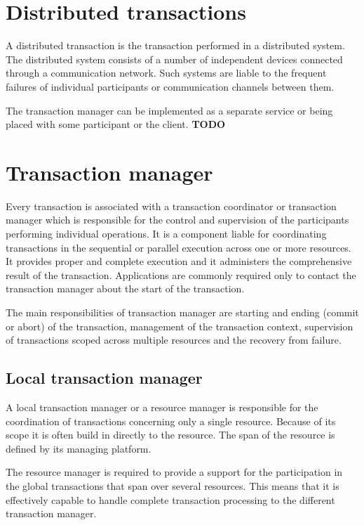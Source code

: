 \documentclass[oneside,
  digital, %
  table,   %
  nolof,     %
  nolot,     %
]{fithesis3}
\begin{document}
\section{Distributed transactions}

A distributed transaction is the transaction performed in a distributed system.  
The distributed system consists of a number of independent devices connected through a communication network. Such systems are liable to the frequent failures of individual participants or communication channels between them. 

The transaction manager can be implemented as a separate service or being placed with some participant or the client. \textbf{TODO}

\section{Transaction manager}

Every transaction is associated with a transaction coordinator or transaction manager which is responsible for the control and supervision of the participants performing individual operations. It is a component liable for coordinating transactions in the sequential or parallel execution across one or more resources. It provides proper and complete execution and it administers the comprehensive result of the transaction.  Applications are commonly required only to contact the transaction manager about the start of the transaction.

The main responsibilities of transaction manager are starting and ending (commit or abort) of the transaction, management of the transaction context, supervision of transactions scoped across multiple resources and the recovery from failure.

\subsection{Local transaction manager}

A local transaction manager or a resource manager is responsible for the coordination of transactions concerning only a single resource. Because of its scope it is often build in directly to the resource. The span of the resource is defined by its managing platform. 

The resource manager is required to provide a support for the participation in the global transactions that span over several resources. This means that it is effectively capable to handle complete transaction processing to the different transaction manager.
\end{document}
